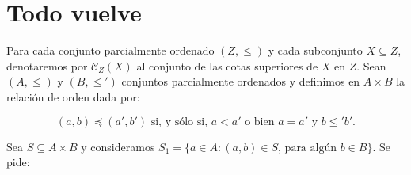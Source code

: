 \documentclass{article}
\begin{document}
\newpage

\section{Todo vuelve}

Para cada conjunto parcialmente ordenado $(Z, \leq)$ y cada subconjunto $X \subseteq Z$, denotaremos por $\mathcal{C}_Z(X)$ al conjunto de las cotas superiores de $X$ en $Z$.
Sean $(A, \leq)$ y $(B, \leq')$ conjuntos parcialmente ordenados y definimos en $A \times B$ la relación de orden dada por:

\[(a, b) \preceq (a', b') \text{ si, y sólo si, } a < a' \text{ o bien } a = a' \text{ y } b \leq' b'.\]

\noindent Sea $S \subseteq A \times B$ y consideramos $S_1 = \{a \in A : (a, b) \in S \text{, para algún } b \in B\}$. Se pide:
\end{document}
